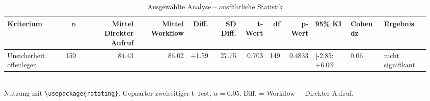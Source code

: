 \begin{table}
\centering
\caption{Ausgewählte Analyse -- ausführliche Statistik}
\begin{tabular}{lrrrrrrrrlll}
\toprule
Kriterium & n & Mittel Direkter Aufruf & Mittel Workflow & Diff. & SD Diff. & t-Wert & df & p-Wert & 95\% KI & Cohen dz & Ergebnis \\
\midrule
Unsicherheit offenlegen & 150 & 84.43 & 86.02 & +1.59 & 27.75 & 0.703 & 149 & 0.4833 & [-2.85; +6.03] & 0.06 & nicht signifikant \\
\bottomrule
\end{tabular}
\\[2mm]
\footnotesize Nutzung mit \texttt{\textbackslash usepackage\{rotating\}}. Gepaarter zweiseitiger t-Test, $\alpha=0.05$. Diff. = Workflow $-$ Direkter Aufruf.
\end{table}
